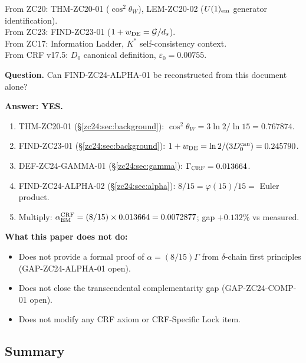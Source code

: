 \documentclass[12pt, a4paper]{article}
\begin{document}
\begin{formalbox}[title={Atomic Units Inherited (not modified)}]
From ZC20: THM-ZC20-01 ($\cos^2\theta_W$), LEM-ZC20-02
  ($U(1)_{\rm em}$ generator identification).\\
From ZC23: FIND-ZC23-01 ($1+w_{\rm DE}=\mathcal{G}/d_s$).\\
From ZC17: Information Ladder, $K^*$ self-consistency context.\\
From CRF v17.5: $D_0$ canonical definition, $\varepsilon_0=0.00755$.
\end{formalbox}

\begin{formalbox}[title={Reconstruction Test (CUIP No-Loss)}]
\textbf{Question.}
Can FIND-ZC24-ALPHA-01 be reconstructed from this document alone?

\textbf{Answer: YES.}
\begin{enumerate}[leftmargin=*, noitemsep]
  \item THM-ZC20-01 (\S\ref{zc24:sec:background}):
    $\cos^2\theta_W = 3\ln 2/\ln 15 = 0.767874$.
  \item FIND-ZC23-01 (\S\ref{zc24:sec:background}):
    $1+w_{\rm DE} = \ln 2/(3D_0^{\rm can}) = 0.245790$.
  \item DEF-ZC24-GAMMA-01 (\S\ref{zc24:sec:gamma}):
    $\Gamma_{\rm CRF} = 0.013664$.
  \item FIND-ZC24-ALPHA-02 (\S\ref{zc24:sec:alpha}):
    $8/15 = \varphi(15)/15 = $ Euler product.
  \item Multiply: $\alpha_{\rm EM}^{\rm CRF} = (8/15)\times 0.013664
    = 0.0072877$; gap $+0.132\%$ vs measured.
\end{enumerate}

\textbf{What this paper does not do:}
\begin{itemize}[leftmargin=*, noitemsep]
  \item Does not provide a formal proof of $\alpha=(8/15)\Gamma$
    from $\delta$-chain first principles (GAP-ZC24-ALPHA-01 open).
  \item Does not close the transcendental complementarity gap
    (GAP-ZC24-COMP-01 open).
  \item Does not modify any CRF axiom or CRF-Specific Lock item.
\end{itemize}
\end{formalbox}

\subsection{Summary}
\label{zc24:sec:summary}
\end{document}
